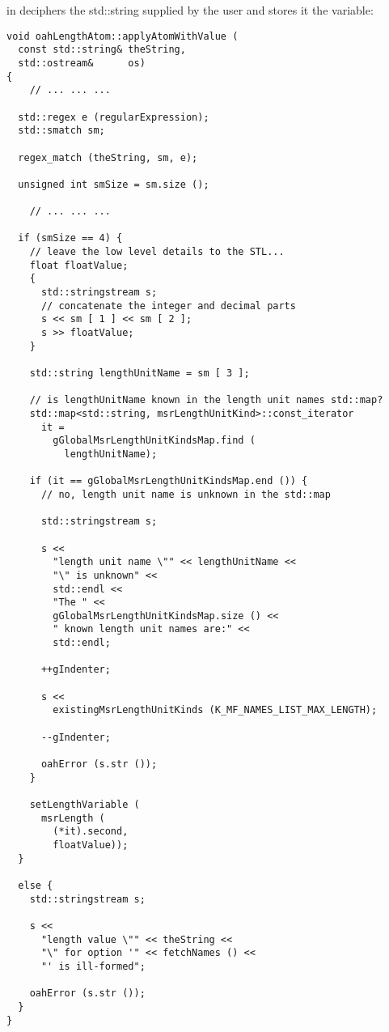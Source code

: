  in  deciphers the std::string supplied by the user and stores it the  variable:
\begin{lstlisting}[language=CPlusPlus]
void oahLengthAtom::applyAtomWithValue (
  const std::string& theString,
  std::ostream&      os)
{
	// ... ... ...

  std::regex e (regularExpression);
  std::smatch sm;

  regex_match (theString, sm, e);

  unsigned int smSize = sm.size ();

	// ... ... ...

  if (smSize == 4) {
    // leave the low level details to the STL...
    float floatValue;
    {
      std::stringstream s;
      // concatenate the integer and decimal parts
      s << sm [ 1 ] << sm [ 2 ];
      s >> floatValue;
    }

    std::string lengthUnitName = sm [ 3 ];

    // is lengthUnitName known in the length unit names std::map?
    std::map<std::string, msrLengthUnitKind>::const_iterator
      it =
        gGlobalMsrLengthUnitKindsMap.find (
          lengthUnitName);

    if (it == gGlobalMsrLengthUnitKindsMap.end ()) {
      // no, length unit name is unknown in the std::map

      std::stringstream s;

      s <<
        "length unit name \"" << lengthUnitName <<
        "\" is unknown" <<
        std::endl <<
        "The " <<
        gGlobalMsrLengthUnitKindsMap.size () <<
        " known length unit names are:" <<
        std::endl;

      ++gIndenter;

      s <<
        existingMsrLengthUnitKinds (K_MF_NAMES_LIST_MAX_LENGTH);

      --gIndenter;

      oahError (s.str ());
    }

    setLengthVariable (
      msrLength (
        (*it).second,
        floatValue));
  }

  else {
    std::stringstream s;

    s <<
      "length value \"" << theString <<
      "\" for option '" << fetchNames () <<
      "' is ill-formed";

    oahError (s.str ());
  }
}
\end{lstlisting}

